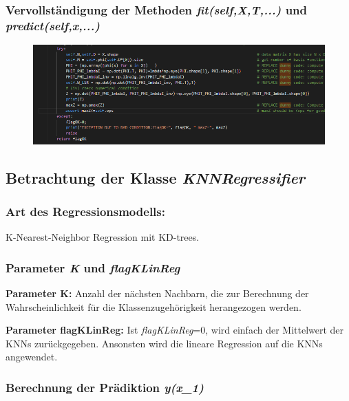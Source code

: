 \subsubsection{ Vervollständigung der Methoden \textit{fit(self,X,T,...)} und \textit{predict(self,x,...)} }

\begin{figure}[H]
    \centering
    \includegraphics[width=1\linewidth]{aufgabe2c_fit.png}
\end{figure}

\subsection{
    Betrachtung der Klasse \textit{KNNRegressifier}
}

\subsubsection{ Art des Regressionsmodells: }

\noindent
 \vspace{0px}
K-Nearest-Neighbor Regression mit KD-trees. 

\subsubsection{ Parameter \textit{K} und \textit{flagKLinReg} }

\noindent
\textbf{Parameter K:} Anzahl der nächsten Nachbarn, die zur Berechnung der Wahrscheinlichkeit für die Klassenzugehörigkeit herangezogen werden.  

\noindent
\textbf{Parameter flagKLinReg:} Ist \textit{flagKLinReg}=0, wird einfach der Mittelwert der KNNs zurückgegeben.
Ansonsten wird die lineare Regression auf die KNNs angewendet. 

\subsubsection{ Berechnung der Prädiktion \textit{y(x_1)} }

